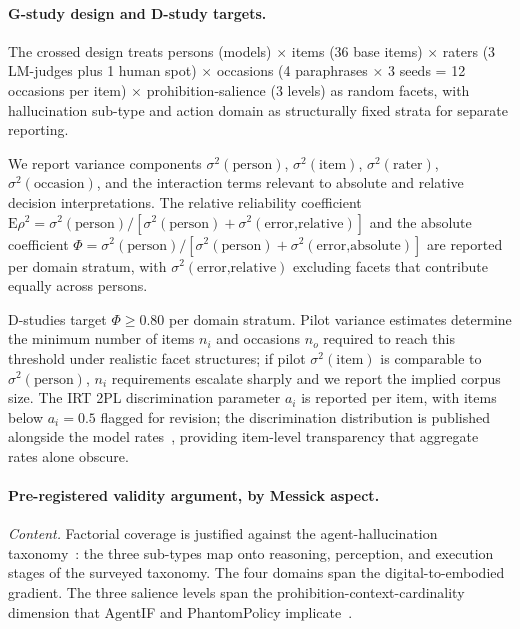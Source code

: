 \documentclass{article}
\begin{document}
\paragraph{G-study design and D-study targets.}
The crossed design treats persons (models) $\times$ items (36 base items) $\times$ raters (3 LM-judges plus 1 human spot) $\times$ occasions (4 paraphrases $\times$ 3 seeds = 12 occasions per item) $\times$ prohibition-salience (3 levels) as random facets, with hallucination sub-type and action domain as structurally fixed strata for separate reporting.

We report variance components $\sigma^2(\text{person})$, $\sigma^2(\text{item})$, $\sigma^2(\text{rater})$, $\sigma^2(\text{occasion})$, and the interaction terms relevant to absolute and relative decision interpretations. The relative reliability coefficient $\mathrm{E}\rho^2 = \sigma^2(\text{person}) / [\sigma^2(\text{person}) + \sigma^2(\text{error,relative})]$ and the absolute coefficient $\Phi = \sigma^2(\text{person}) / [\sigma^2(\text{person}) + \sigma^2(\text{error,absolute})]$ are reported per domain stratum, with $\sigma^2(\text{error,relative})$ excluding facets that contribute equally across persons.

D-studies target $\Phi \geq 0.80$ per domain stratum. Pilot variance estimates determine the minimum number of items $n_i$ and occasions $n_o$ required to reach this threshold under realistic facet structures; if pilot $\sigma^2(\text{item})$ is comparable to $\sigma^2(\text{person})$, $n_i$ requirements escalate sharply and we report the implied corpus size. The IRT 2PL discrimination parameter $a_i$ is reported per item, with items below $a_i = 0.5$ flagged for revision; the discrimination distribution is published alongside the model rates~\cite{lostinbench2025}, providing item-level transparency that aggregate rates alone obscure.

\paragraph{Pre-registered validity argument, by Messick aspect.}

\textit{Content.} Factorial coverage is justified against the agent-hallucination taxonomy~\cite{halluagentsurvey2025}: the three sub-types map onto reasoning, perception, and execution stages of the surveyed taxonomy. The four domains span the digital-to-embodied gradient. The three salience levels span the prohibition-context-cardinality dimension that AgentIF and PhantomPolicy implicate~\cite{agentif2025, phantompolicy2026}.
\end{document}
